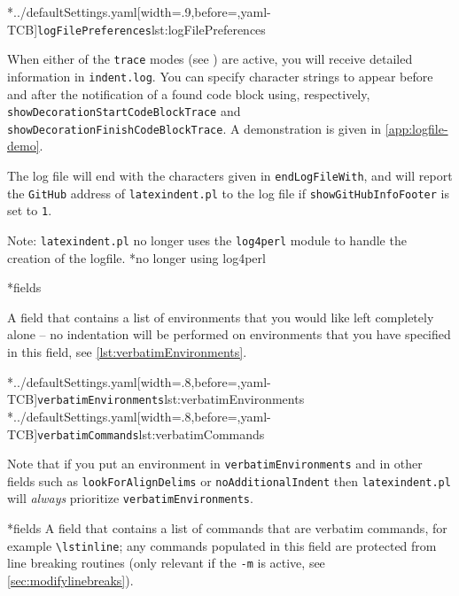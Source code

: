 	\cmhlistingsfromfile[style=logFilePreferences,]*{../defaultSettings.yaml}[width=.9\linewidth,before=\centering,yaml-TCB]{\texttt{logFilePreferences}}{lst:logFilePreferences}

	When%
	 either of the
	\texttt{trace} modes (see ) are active, you will receive
	detailed information in \texttt{indent.log}. You can specify character strings to
	appear before and after the notification of a found code block using, respectively,
	\texttt{showDecorationStartCodeBlockTrace} and \texttt{showDecorationFinishCodeBlockTrace}. A demonstration is given in
	\vref{app:logfile-demo}.

	The log file will end with the characters given in \texttt{endLogFileWith}, and will
	report the \texttt{GitHub} address of \texttt{latexindent.pl} to the log file if
	\texttt{showGitHubInfoFooter} is set to \texttt{1}.

	Note: \texttt{latexindent.pl} no longer uses the \texttt{log4perl} module to handle
	the creation of the logfile.%
	*{no longer using log4perl}

*{fields}

	A field that contains a list of environments that you would like left completely alone --
	no indentation will be performed on environments that you have specified in this field,
	see \cref{lst:verbatimEnvironments}.

	\begin{cmhtcbraster}[raster column skip=.1\linewidth]
		\cmhlistingsfromfile[style=verbatimEnvironments]*{../defaultSettings.yaml}[width=.8\linewidth,before=\centering,yaml-TCB]{\texttt{verbatimEnvironments}}{lst:verbatimEnvironments}
		\cmhlistingsfromfile[style=verbatimCommands]*{../defaultSettings.yaml}[width=.8\linewidth,before=\centering,yaml-TCB]{\texttt{verbatimCommands}}{lst:verbatimCommands}
	\end{cmhtcbraster}

	Note that if you put an environment in	\texttt{verbatimEnvironments} and in other fields such
	as \texttt{lookForAlignDelims} or \texttt{noAdditionalIndent} then \texttt{latexindent.pl} will
	\emph{always} prioritize  \texttt{verbatimEnvironments}.

*{fields}
	A field that contains a list of commands that are verbatim commands, for example
	\lstinline|\lstinline|; any commands populated in this field are protected from line
	breaking routines (only relevant if the \texttt{-m} is active, see
	\vref{sec:modifylinebreaks}).


